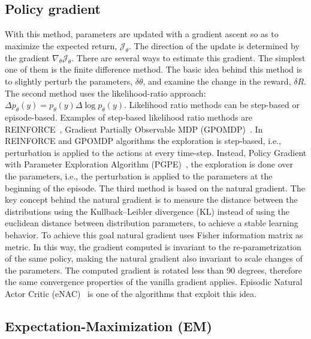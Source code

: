 \subsection{Policy gradient}
With this method, parameters are updated with a gradient ascent so as to maximize the expected return, $\mathcal{J}_\theta$. The direction of the update is determined by the gradient $\nabla_\theta\mathcal{J}_\theta$. There are several ways to estimate this gradient. The simplest one of them is the finite difference method. The basic idea behind this method is to slightly perturb the parameters, $\delta\theta$, and examine the change in the reward, $\delta R$. The second method uses the likelihood-ratio approach: $\Delta p_\theta(y)=p_\theta(y)\Delta\log p_\theta(y)$. Likelihood ratio methods can be step-based or episode-based. Examples of step-based likelihood ratio methods are REINFORCE~\cite{Williams1992SimpleSG}, Gradient Partially Observable MDP (GPOMDP)~\cite{Baxter1999DirectGR, Bartlett2001InfiniteHorizonPE}. In REINFORCE and GPOMDP  algorithms the exploration is step-based, i.e., perturbation is applied to the actions at every time-step. Instead, Policy Gradient with Parameter Exploration Algorithm (PGPE)~\cite{Sehnke2008PolicyGW}, the exploration is done over the parameters, i.e., the perturbation is applied to the parameters at the beginning of the episode. The third method is based on the natural gradient. The key concept behind the natural gradient is to measure the distance between the distributions using the Kullback–Leibler divergence (KL) instead of using the euclidean distance between distribution parameters, to achieve a stable learning behavior. To achieve this goal natural gradient uses Fisher information matrix as metric. In this way, the gradient computed is invariant to the re-parametrization of the same policy, making the natural gradient also invariant to scale changes of the parameters. The computed gradient is rotated less than 90 degrees, therefore the same convergence properties of the vanilla gradient applies. Episodic Natural Actor Critic (eNAC)~\cite{Peters:2008:NA:1352927.1352986} is one of the algorithms that exploit this idea. 

\subsection{Expectation-Maximization (EM)}

